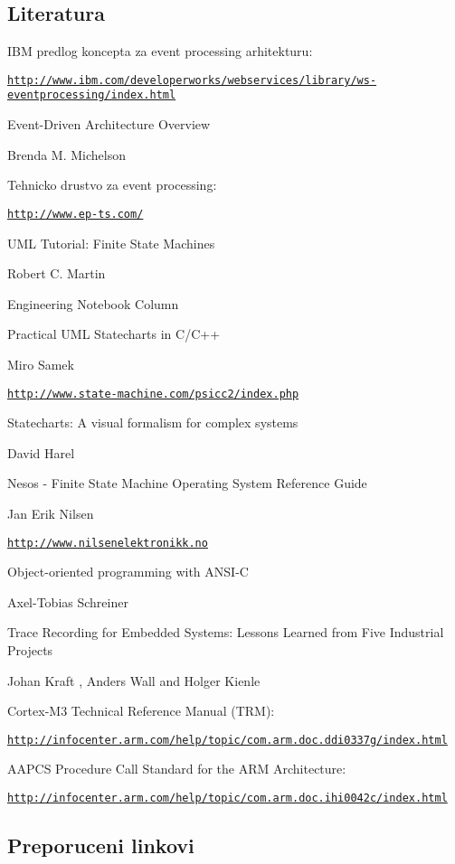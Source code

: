 \hypertarget{lit_lit_papers}{}\subsection{Literatura}\label{lit_lit_papers}

\begin{DoxyItemize}
\item I\-B\-M predlog koncepta za event processing arhitekturu\-: \par
\href{http://www.ibm.com/developerworks/webservices/library/ws-eventprocessing/index.html}{\tt http\-://www.\-ibm.\-com/developerworks/webservices/library/ws-\/eventprocessing/index.\-html}
\item Event-\/\-Driven Architecture Overview \par
Brenda M. Michelson
\item Tehnicko drustvo za event processing\-: \par
\href{http://www.ep-ts.com/}{\tt http\-://www.\-ep-\/ts.\-com/}
\item U\-M\-L Tutorial\-: Finite State Machines \par
Robert C. Martin \par
Engineering Notebook Column
\item Practical U\-M\-L Statecharts in C/\-C++ \par
Miro Samek\par
\href{http://www.state-machine.com/psicc2/index.php}{\tt http\-://www.\-state-\/machine.\-com/psicc2/index.\-php}
\item Statecharts\-: A visual formalism for complex systems \par
David Harel
\item Nesos -\/ Finite State Machine Operating System Reference Guide \par
Jan Erik Nilsen \par
\href{http://www.nilsenelektronikk.no}{\tt http\-://www.\-nilsenelektronikk.\-no}
\item Object-\/oriented programming with A\-N\-S\-I-\/\-C \par
Axel-\/\-Tobias Schreiner
\item Trace Recording for Embedded Systems\-: Lessons Learned from Five Industrial Projects \par
Johan Kraft , Anders Wall and Holger Kienle
\item Cortex-\/\-M3 Technical Reference Manual (T\-R\-M)\-: \par
 \href{http://infocenter.arm.com/help/topic/com.arm.doc.ddi0337g/index.html}{\tt http\-://infocenter.\-arm.\-com/help/topic/com.\-arm.\-doc.\-ddi0337g/index.\-html}
\item A\-A\-P\-C\-S Procedure Call Standard for the A\-R\-M Architecture\-: \par
\href{http://infocenter.arm.com/help/topic/com.arm.doc.ihi0042c/index.html}{\tt http\-://infocenter.\-arm.\-com/help/topic/com.\-arm.\-doc.\-ihi0042c/index.\-html}
\end{DoxyItemize}\hypertarget{lit_lit_links}{}\subsection{Preporuceni linkovi}\label{lit_lit_links}

